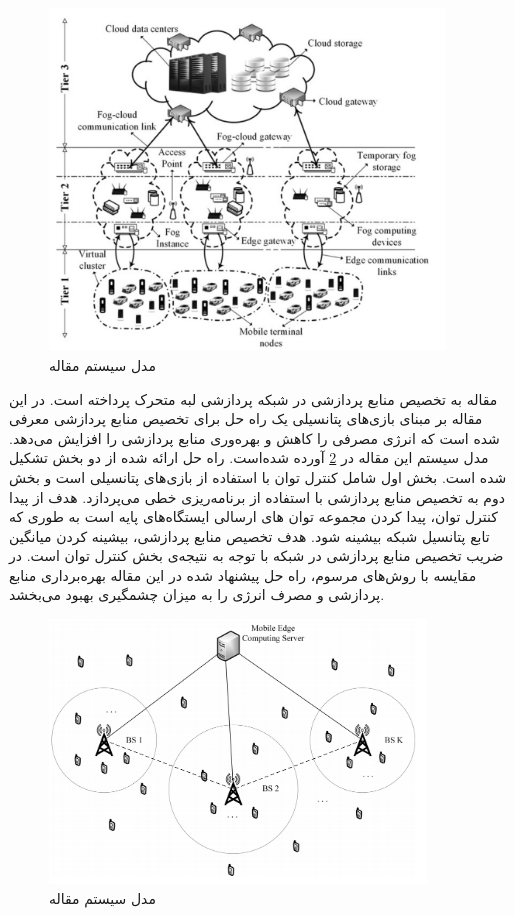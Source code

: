     \begin{figure}[h]
      \centerline{\includegraphics[width=10.5cm]{graphics/chapter_2/system_model_sarkar2016theoretical}}
      \caption{مدل سیستم مقاله \cite{sarkar2016theoretical}}
      \label{fig:chapter_2:system_model_sarkar2016theoretical}
    \end{figure}

    مقاله \cite{heng2019computing} به تخصیص منابع پردازشی در شبکه پردازشی لبه متحرک پرداخته است.
    در این مقاله بر مبنای بازی‌های پتانسیلی یک راه حل برای تخصیص منابع پردازشی معرفی شده است که انرژی مصرفی را کاهش و بهره‌وری منابع پردازشی را افزایش می‌دهد.
    مدل سیستم این مقاله در \cref{fig:chapter_2:system_model_heng2019computing} آورده شده‌است.
    راه حل ارائه شده از دو بخش تشکیل شده است.
    بخش اول شامل کنترل توان با استفاده از بازی‌های پتانسیلی است و بخش دوم به تخصیص منابع پردازشی با استفاده از برنامه‌ریزی خطی می‌پردازد.
    هدف از پیدا کنترل توان، پیدا کردن مجموعه توان ‌های ارسالی ایستگاه‌های پایه است به طوری که تابع پتانسیل شبکه بیشینه شود.
    هدف تخصیص منابع پردازشی، بیشینه کردن میانگین ضریب تخصیص منابع پردازشی در شبکه با توجه به نتیجه‌ی بخش کنترل توان است.
    در مقایسه با روش‌های مرسوم، راه حل پیشنهاد شده در این مقاله بهره‌برداری منابع پردازشی و مصرف انرژی را به میزان چشمگیری بهبود می‌بخشد.

    \begin{figure}[h]
      \centerline{\includegraphics[width=10cm]{graphics/chapter_2/system_model_heng2019computing}}
      \caption{مدل سیستم مقاله \cite{heng2019computing}}
      \label{fig:chapter_2:system_model_heng2019computing}
    \end{figure}

